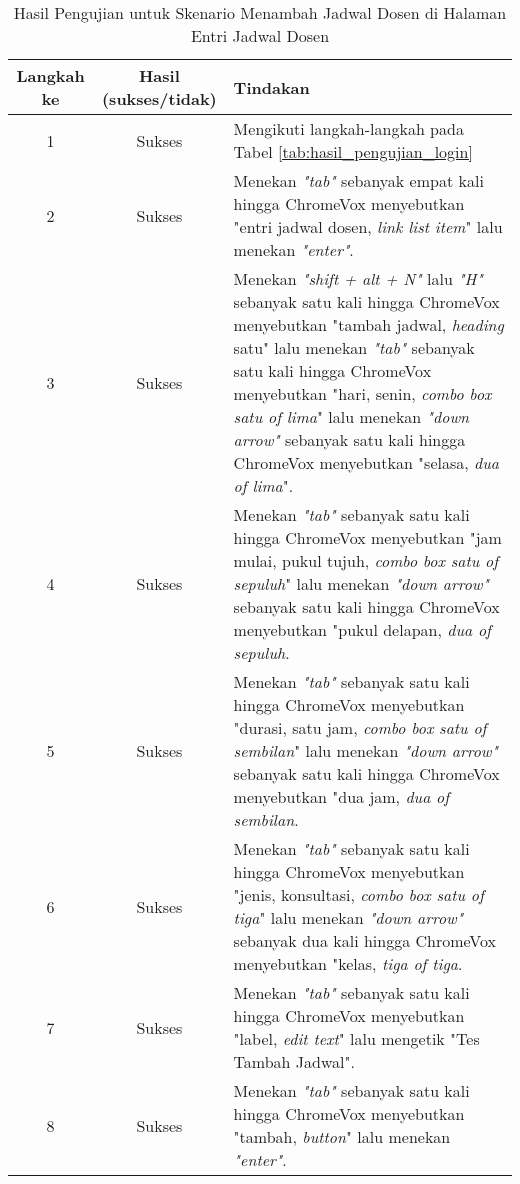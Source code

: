 \begin{table}[H]
    \centering 
    \caption{Hasil Pengujian untuk Skenario Menambah Jadwal Dosen di Halaman Entri Jadwal Dosen}
    \label{tab:hasil_pengujian_menambah_jadwal_dosen_di_halaman_entri_jadwal_dosen}
    \begin{tabular}{|c|c|p{10cm}|}
        \toprule
        Langkah ke & Hasil (sukses/tidak) & Tindakan \\

        \midrule
        1 & Sukses & Mengikuti langkah-langkah pada Tabel \ref{tab:hasil_pengujian_login} \\
        2 & Sukses & Menekan \textit{"tab"} sebanyak empat kali hingga ChromeVox menyebutkan "entri jadwal dosen, \textit{link list item}" lalu menekan \textit{"enter"}. \\
        3 & Sukses & Menekan \textit{"shift + alt + N"} lalu \textit{"H"} sebanyak satu kali hingga ChromeVox menyebutkan "tambah jadwal, \textit{heading} satu" lalu menekan \textit{"tab"} sebanyak satu kali hingga ChromeVox menyebutkan "hari, senin, \textit{combo box satu of lima}" lalu menekan \textit{"down arrow"} sebanyak satu kali hingga ChromeVox menyebutkan "selasa, \textit{dua of lima}". \\
        4 & Sukses & Menekan \textit{"tab"} sebanyak satu kali hingga ChromeVox menyebutkan "jam mulai, pukul tujuh, \textit{combo box satu of sepuluh}" lalu menekan \textit{"down arrow"} sebanyak satu kali hingga ChromeVox menyebutkan "pukul delapan, \textit{dua of sepuluh}. \\ 
        5 & Sukses & Menekan \textit{"tab"} sebanyak satu kali hingga ChromeVox menyebutkan "durasi, satu jam, \textit{combo box satu of sembilan}" lalu menekan \textit{"down arrow"} sebanyak satu kali hingga ChromeVox menyebutkan "dua jam, \textit{dua of sembilan}. \\ 
        6 & Sukses & Menekan \textit{"tab"} sebanyak satu kali hingga ChromeVox menyebutkan "jenis, konsultasi, \textit{combo box satu of tiga}" lalu menekan \textit{"down arrow"} sebanyak dua kali hingga ChromeVox menyebutkan "kelas, \textit{tiga of tiga}. \\ 
        7 & Sukses & Menekan \textit{"tab"} sebanyak satu kali hingga ChromeVox menyebutkan "label, \textit{edit text}" lalu mengetik "Tes Tambah Jadwal". \\ 
        8 & Sukses & Menekan \textit{"tab"} sebanyak satu kali hingga ChromeVox menyebutkan "tambah, \textit{button}" lalu menekan \textit{"enter"}. \\ 

        \bottomrule

    \end{tabular}
\end{table}

